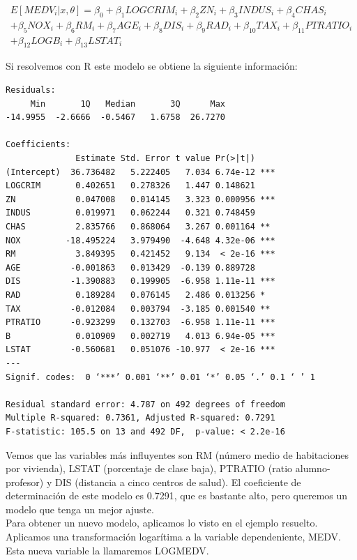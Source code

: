 \documentclass[12pt,a4paper,twoside,openright,titlepage,final]{article}
\begin{document}
\begin{multline*}
E[MEDV_i |x, \theta] = \beta_0 + \beta_1 LOGCRIM_i + \beta_2 ZN_i + \beta_3 INDUS_i + \beta_4 CHAS_i \\ + \beta_5 NOX_i + \beta_6 RM_i + \beta_7 AGE_i + \beta_8 DIS_i + \beta_9 RAD_i + \beta_{10} TAX_i + \beta_{11} PTRATIO_i \\ + \beta_{12} LOGB_i + \beta_{13} LSTAT_i
\end{multline*}

Si resolvemos con R este modelo se obtiene la siguiente información:

\begin{verbatim}
Residuals:
     Min       1Q   Median       3Q      Max 
-14.9955  -2.6666  -0.5467   1.6758  26.7270 

Coefficients:
              Estimate Std. Error t value Pr(>|t|)    
(Intercept)  36.736482   5.222405   7.034 6.74e-12 ***
LOGCRIM       0.402651   0.278326   1.447 0.148621    
ZN            0.047008   0.014145   3.323 0.000956 ***
INDUS         0.019971   0.062244   0.321 0.748459    
CHAS          2.835766   0.868064   3.267 0.001164 ** 
NOX         -18.495224   3.979490  -4.648 4.32e-06 ***
RM            3.849395   0.421452   9.134  < 2e-16 ***
AGE          -0.001863   0.013429  -0.139 0.889728    
DIS          -1.390883   0.199905  -6.958 1.11e-11 ***
RAD           0.189284   0.076145   2.486 0.013256 *  
TAX          -0.012084   0.003794  -3.185 0.001540 ** 
PTRATIO      -0.923299   0.132703  -6.958 1.11e-11 ***
B             0.010909   0.002719   4.013 6.94e-05 ***
LSTAT        -0.560681   0.051076 -10.977  < 2e-16 ***
---
Signif. codes:  0 ‘***’ 0.001 ‘**’ 0.01 ‘*’ 0.05 ‘.’ 0.1 ‘ ’ 1 

Residual standard error: 4.787 on 492 degrees of freedom
Multiple R-squared: 0.7361,	Adjusted R-squared: 0.7291 
F-statistic: 105.5 on 13 and 492 DF,  p-value: < 2.2e-16 
\end{verbatim}

Vemos que las variables más influyentes son RM (número medio de habitaciones por vivienda), LSTAT (porcentaje de clase baja), PTRATIO (ratio alumno-profesor) y DIS (distancia a cinco centros de salud). El coeficiente de determinación de este modelo es 0.7291, que es bastante alto, pero queremos un modelo que tenga un mejor ajuste.\\

Para obtener un nuevo modelo, aplicamos lo visto en el ejemplo resuelto. Aplicamos una transformación logarítima a la variable dependeniente, MEDV. Esta nueva variable la llamaremos LOGMEDV.\\
\end{document}
